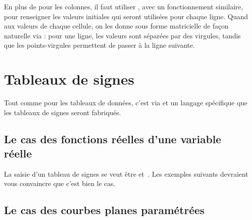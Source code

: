 

\begin{tdocexa}
    En plus de  pour les colonnes, il faut utiliser , avec un fonctionnement similaire, pour renseigner les valeurs initiales qui seront utilisées pour chaque ligne.
    Quand aux valeurs de chaque cellule, on les donne sous forme matricielle de façon naturelle via  : pour une ligne, les valeurs sont séparées par des virgules, tandis que les points-virgules permettent de passer à la ligne suivante.

\end{tdocexa}




\begin{tdocexa}
    \leavevmode

\end{tdocexa}


\section{Tableaux de signes}

\begin{tdocnote}
	Tout comme pour les tableaux de données, c'est via  et un langage spécifique que les tableaux de signes seront fabriqués.
\end{tdocnote}




\subsection{Le cas des fonctions réelles d'une variable réelle}

La saisie d'un tableau de signes se veut être  et \,. Les exemples suivants devraient vous convaincre que c'est bien le cas.



\subsection{Le cas des courbes planes paramétrées}

